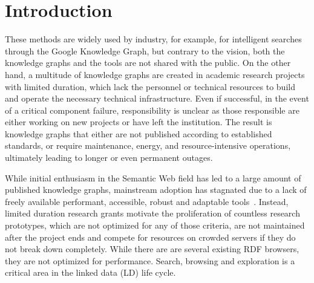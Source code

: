 \documentclass{ceurart}
\begin{document}
\section{Introduction}\label{summary}
These methods are widely used by industry, for example, for intelligent searches through the Google Knowledge Graph, but contrary to the vision, both the knowledge graphs and the tools are not shared with the public.
On the other hand, a multitude of knowledge graphs are created in academic research projects with limited duration, which lack the personnel or technical resources to build and operate the necessary technical infrastructure. Even if successful, in the event of a critical component failure, responsibility is unclear as those responsible are either working on new projects or have left the institution.
The result is knowledge graphs that either are not published according to established standards, or require maintenance, energy, and resource-intensive operations, ultimately leading to longer or even permanent outages.

While initial enthusiasm in the Semantic Web field has led to a large amount of published knowledge graphs, mainstream adoption has stagnated due to a lack of freely available performant, accessible, robust and adaptable tools~\citep{semanticwebreview}.
Instead, limited duration research grants motivate the proliferation of countless research prototypes, which are not optimized for any of those criteria, are not maintained after the project ends and compete for resources on crowded servers if they do not break down completely.
While there are are several existing RDF browsers, they are not optimized for performance.
Search, browsing and exploration is a critical area in the linked data (LD) life cycle.
\end{document}
